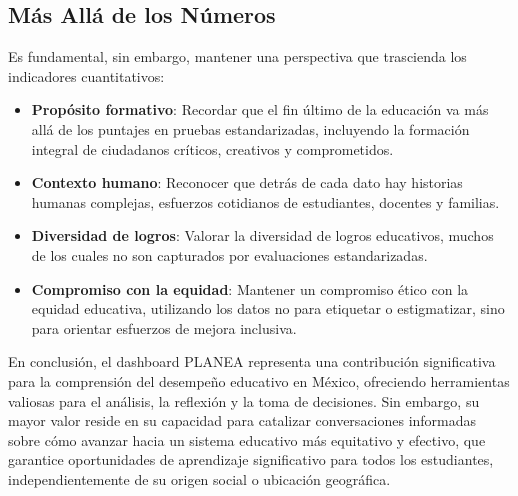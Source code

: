 \subsection{Más Allá de los Números}
Es fundamental, sin embargo, mantener una perspectiva que trascienda los indicadores cuantitativos:

\begin{itemize}
    \item \textbf{Propósito formativo}: Recordar que el fin último de la educación va más allá de los puntajes en pruebas estandarizadas, incluyendo la formación integral de ciudadanos críticos, creativos y comprometidos.
    
    \item \textbf{Contexto humano}: Reconocer que detrás de cada dato hay historias humanas complejas, esfuerzos cotidianos de estudiantes, docentes y familias.
    
    \item \textbf{Diversidad de logros}: Valorar la diversidad de logros educativos, muchos de los cuales no son capturados por evaluaciones estandarizadas.
    
    \item \textbf{Compromiso con la equidad}: Mantener un compromiso ético con la equidad educativa, utilizando los datos no para etiquetar o estigmatizar, sino para orientar esfuerzos de mejora inclusiva.
\end{itemize}

En conclusión, el dashboard PLANEA representa una contribución significativa para la comprensión del desempeño educativo en México, ofreciendo herramientas valiosas para el análisis, la reflexión y la toma de decisiones. Sin embargo, su mayor valor reside en su capacidad para catalizar conversaciones informadas sobre cómo avanzar hacia un sistema educativo más equitativo y efectivo, que garantice oportunidades de aprendizaje significativo para todos los estudiantes, independientemente de su origen social o ubicación geográfica.
